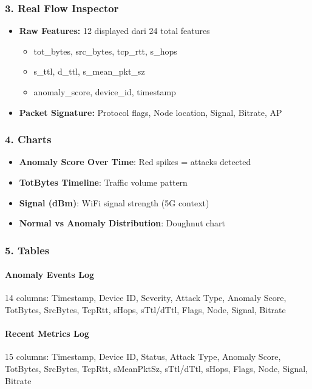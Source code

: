 \documentclass[12pt,a4paper]{article}
\begin{document}
\subsubsection{3. Real Flow Inspector}
\begin{itemize}
    \item \textbf{Raw Features:} 12 displayed dari 24 total features
    \begin{itemize}
        \item tot\_bytes, src\_bytes, tcp\_rtt, s\_hops
        \item s\_ttl, d\_ttl, s\_mean\_pkt\_sz
        \item anomaly\_score, device\_id, timestamp
    \end{itemize}
    \item \textbf{Packet Signature:} Protocol flags, Node location, Signal, Bitrate, AP
\end{itemize}

\subsubsection{4. Charts}
\begin{itemize}
    \item \textbf{Anomaly Score Over Time}: Red spikes = attacks detected
    \item \textbf{TotBytes Timeline}: Traffic volume pattern
    \item \textbf{Signal (dBm)}: WiFi signal strength (5G context)
    \item \textbf{Normal vs Anomaly Distribution}: Doughnut chart
\end{itemize}

\subsubsection{5. Tables}

\paragraph{Anomaly Events Log}
14 columns: Timestamp, Device ID, Severity, Attack Type, Anomaly Score, TotBytes, SrcBytes, TcpRtt, sHops, sTtl/dTtl, Flags, Node, Signal, Bitrate

\paragraph{Recent Metrics Log}
15 columns: Timestamp, Device ID, Status, Attack Type, Anomaly Score, TotBytes, SrcBytes, TcpRtt, sMeanPktSz, sTtl/dTtl, sHops, Flags, Node, Signal, Bitrate
\end{document}
